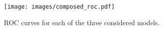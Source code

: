 \begin{figure}[t]
\centering
\texttt{[image: images/composed\_roc.pdf]}
\caption{ROC curves for each of the three considered models.}\label{fig_rocs}
\end{figure}

